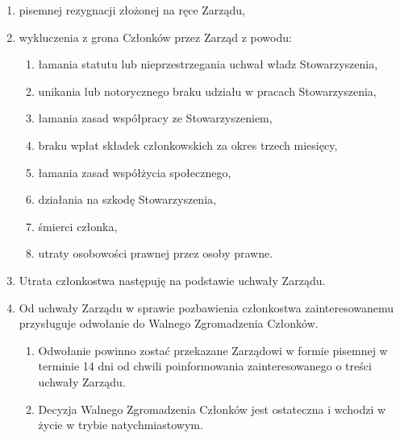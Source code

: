 \documentclass{article}
\begin{document}
\begin{enumerate}
      \begin{enumerate}
        \item pisemnej rezygnacji złożonej na ręce Zarządu,
        \item wykluczenia z grona Członków przez Zarząd z powodu:
          \begin{enumerate}
            \item łamania statutu lub nieprzestrzegania uchwał władz Stowarzyszenia,
            \item unikania lub notorycznego braku udziału w pracach Stowarzyszenia,
            \item łamania zasad współpracy ze Stowarzyszeniem,
            \item braku wpłat składek członkowskich za okres trzech miesięcy,
            \item łamania zasad współżycia społecznego,
            \item działania na szkodę Stowarzyszenia,
            \item śmierci członka,
            \item utraty osobowości prawnej przez osoby prawne.
          \end{enumerate}
        \item Utrata członkostwa następuję na podstawie uchwały Zarządu.
        \item Od uchwały Zarządu w sprawie pozbawienia członkostwa zainteresowanemu przysługuje odwołanie do Walnego Zgromadzenia Członków.
          \begin{enumerate}
            \item Odwołanie powinno zostać przekazane Zarządowi w formie pisemnej w terminie 14 dni od chwili poinformowania zainteresowanego o treści uchwały Zarządu.
            \item Decyzja Walnego Zgromadzenia Członków jest ostateczna i wchodzi w życie w trybie natychmiastowym.
          \end{enumerate}
      \end{enumerate}
  \end{enumerate}
\end{document}
